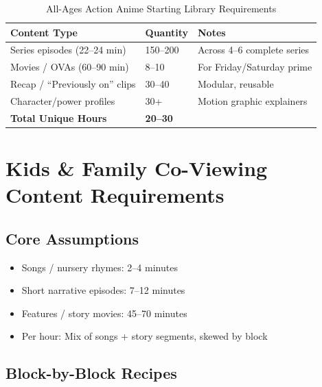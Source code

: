 \documentclass[12pt,letterpaper,twoside]{report}
\begin{document}
\begin{table}[H]
\centering
\caption{All-Ages Action Anime Starting Library Requirements}
\label{tab:anime-library}
\begin{tabular}{@{}L{6cm}R{3cm}L{5cm}@{}}
\toprule
\textbf{Content Type} & \textbf{Quantity} & \textbf{Notes} \\
\midrule
Series episodes (22--24 min) & 150--200 & Across 4--6 complete series \\
Movies / OVAs (60--90 min) & 8--10 & For Friday/Saturday prime \\
Recap / ``Previously on'' clips & 30--40 & Modular, reusable \\
Character/power profiles & 30+ & Motion graphic explainers \\
\midrule
\textbf{Total Unique Hours} & \textbf{20--30} & \\
\bottomrule
\end{tabular}
\end{table}

\section{Kids \& Family Co-Viewing Content Requirements}

\subsection{Core Assumptions}

\begin{itemize}[leftmargin=1.5cm]
    \item Songs / nursery rhymes: 2--4 minutes
    \item Short narrative episodes: 7--12 minutes
    \item Features / story movies: 45--70 minutes
    \item Per hour: Mix of songs + story segments, skewed by block
\end{itemize}

\subsection{Block-by-Block Recipes}
\end{document}
